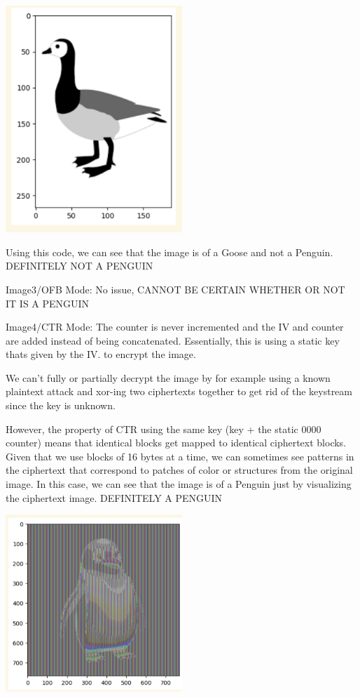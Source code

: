 \documentclass[11pt]{article}
\begin{document}
\includegraphics[width=0.5\textwidth]{a2q2_1.png}

Using this code, we can see that the image is of a Goose and not a Penguin. DEFINITELY NOT A PENGUIN

Image3/OFB Mode: No issue, CANNOT BE CERTAIN WHETHER OR NOT IT IS A PENGUIN

Image4/CTR Mode: The counter is never incremented and the IV and counter are added instead of being concatenated. Essentially, this is using a static key thats given by the IV. to encrypt the image.

We can't fully or partially decrypt the image by for example using a known plaintext attack and xor-ing two ciphertexts together to get rid of the keystream since the key is unknown.

However, the property of CTR using the same key (key + the static 0000 counter) means that identical blocks get mapped to identical ciphertext blocks. Given that we use blocks of 16 bytes at a time, we can sometimes see patterns in the ciphertext that correspond to patches of color or structures from the original image. In this case, we can see that the image is of a Penguin just by visualizing the ciphertext image. DEFINITELY A PENGUIN

\includegraphics[width=0.5\textwidth]{a2q2_2.png}
\end{document}
